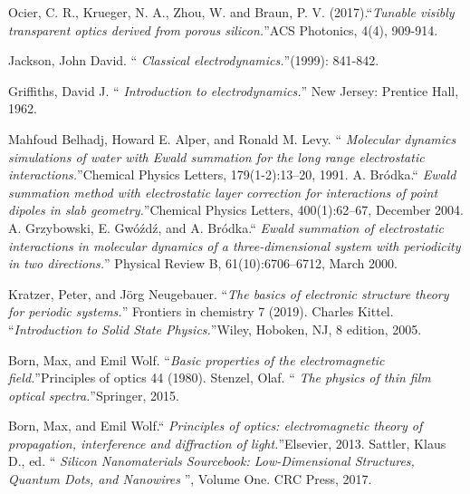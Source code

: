 \documentclass{article}
\begin{document}
\begin{thebibliography}{XX}
 Ocier, C. R., Krueger, N. A., Zhou, W. and  Braun,
  P. V. (2017).\textquotedblleft \emph{Tunable visibly transparent
    optics derived from porous silicon.}\textquotedblright ACS
  Photonics, 4(4), 909-914.


  Jackson, John David. \textquotedblleft
  \emph{Classical electrodynamics.}\textquotedblright (1999): 841-842.

Griffiths, David J. \textquotedblleft
\emph{Introduction to electrodynamics.}\textquotedblright
 New Jersey: Prentice Hall, 1962.

  Mahfoud Belhadj, Howard E. Alper, and Ronald M. Levy. \textquotedblleft
 \emph{ Molecular dynamics simulations of water with Ewald summation
 	for the long range electrostatic interactions.}\textquotedblright Chemical
  Physics Letters, 179(1-2):13–20, 1991.
   A. Bródka.\textquotedblleft
   \emph{ Ewald summation method with electrostatic layer correction for
  interactions of point dipoles in slab geometry.}\textquotedblright Chemical
Physics Letters, 400(1):62–67, December 2004.
  A. Grzybowski, E. Gwóźdź, and A. Bródka.\textquotedblleft
 \emph{ Ewald summation of electrostatic interactions in molecular dynamics
 	 of a three-dimensional system with periodicity in two directions.}\textquotedblright
  Physical Review B, 61(10):6706–6712, March 2000.

  Kratzer, Peter, and Jörg Neugebauer. \textquotedblleft \emph{The basics of
 	electronic structure theory for periodic systems.}\textquotedblright
  Frontiers in chemistry 7 (2019).
  Charles Kittel. \textquotedblleft \emph{Introduction to Solid State
 	 Physics.}\textquotedblright Wiley, Hoboken, NJ, 8 edition, 2005.

 Born, Max, and Emil Wolf. \textquotedblleft \emph{Basic properties of
   	the electromagnetic field.}\textquotedblright Principles of optics 44 (1980).
   Stenzel, Olaf. \textquotedblleft \emph{ The physics of thin film
  	optical spectra.}\textquotedblright Springer, 2015.

  Born, Max, and Emil Wolf.\textquotedblleft \emph{ Principles of optics:
  	electromagnetic theory of propagation, interference
  	 and diffraction of light.}\textquotedblright Elsevier, 2013.
   Sattler, Klaus D., ed. \textquotedblleft \emph{ Silicon Nanomaterials
  	Sourcebook: Low-Dimensional Structures, Quantum Dots, and Nanowires }\textquotedblright,
   Volume One. CRC Press, 2017.




\end{thebibliography}
\end{document}

